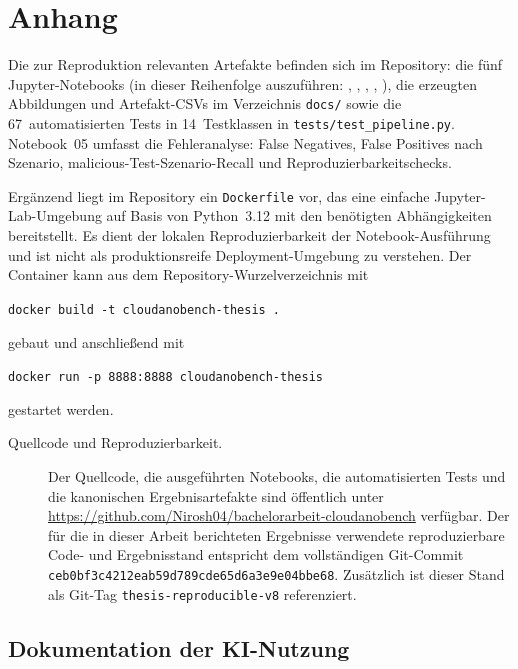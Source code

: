 
\section{Anhang}
\label{sec:appendix}

Die zur Reproduktion relevanten Artefakte befinden sich im Repository: die fünf
Jupyter-Notebooks (in dieser Reihenfolge auszuführen: ,
, , ,
), die erzeugten Abbildungen und Artefakt-CSVs im
Verzeichnis \texttt{docs/} sowie die 67~automatisierten Tests in 14~Testklassen in
\texttt{tests/test\_pipeline.py}. Notebook~05 umfasst die Fehleranalyse: False
Negatives, False Positives nach Szenario, malicious-Test-Szenario-Recall und
Reproduzierbarkeitschecks.

Ergänzend liegt im Repository ein \texttt{Dockerfile} vor, das eine einfache
Jupyter-Lab-Umgebung auf Basis von Python~3.12 mit den benötigten Abhängigkeiten
bereitstellt. Es dient der lokalen Reproduzierbarkeit der Notebook-Ausführung und
ist nicht als produktionsreife Deployment-Umgebung zu verstehen. Der Container kann aus dem Repository-Wurzelverzeichnis mit
\begin{center}
\texttt{docker build -t cloudanobench-thesis .}
\end{center}
gebaut und anschließend mit
\begin{center}
\texttt{docker run -p 8888:8888 cloudanobench-thesis}
\end{center}
gestartet werden.

\begin{description}
  \item[Quellcode und Reproduzierbarkeit.]
    Der Quellcode, die ausgeführten Notebooks, die automatisierten Tests und die
    kanonischen Ergebnisartefakte sind öffentlich unter
    \url{https://github.com/Nirosh04/bachelorarbeit-cloudanobench} verfügbar.
    Der für die in dieser Arbeit berichteten Ergebnisse verwendete
    reproduzierbare Code- und Ergebnisstand entspricht dem vollständigen
    Git-Commit\newline
    \texttt{ceb0bf3c4212eab59d789cde65d6a3e9e04bbe68}. Zusätzlich ist dieser
    Stand als Git-Tag \texttt{thesis-reproducible-v8} referenziert.
\end{description}

\subsection{Dokumentation der KI-Nutzung}\label{sec:ki-nutzung}

